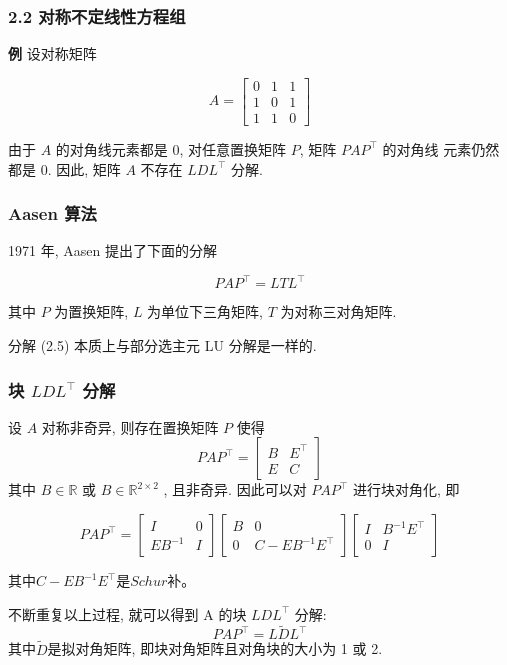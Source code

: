 \documentclass[notheorems,serif]{beamer}
\begin{document}
\begin{frame}
\frametitle{2.2 \quad 对称不定线性方程组}
{\bfseries 例} 设对称矩阵

\begin{equation}
A=\left[\begin{array}{lll}{0} & {1} & {1} \\ {1} & {0} & {1} \\ {1} & {1} & {0}\end{array}\right]
\end{equation}

由于 $A$ 的对角线元素都是 $0$, 对任意置换矩阵 $P$, 矩阵 $P AP^{\top}$ 的对角线
元素仍然都是 $0$. 因此, 矩阵 $A$ 不存在 $LDL^{\top}$ 分解.
\end{frame}

\begin{frame}
\frametitle{Aasen 算法}
1971 年, Aasen 提出了下面的分解

\begin{equation}
P A P^{\top}=L T L^{\top}
\end{equation}

其中 $P$ 为置换矩阵, $L$ 为单位下三角矩阵, $T$ 为对称三对角矩阵.

分解 (2.5) 本质上与部分选主元 LU 分解是一样的.
\end{frame}

\begin{frame}
\frametitle{块 $LDL^{\top}$ 分解}
设 $A$ 对称非奇异, 则存在置换矩阵 $P$ 使得
\begin{equation}
P A P^{\top}=\left[\begin{array}{cc}{B} & {E^{\top}} \\ {E} & {C}\end{array}\right]
\end{equation}
其中 $B ∈ \mathbb{R}$ 或 $B ∈ \mathbb{R}^{2×2}$
, 且非奇异. 因此可以对 $P AP^{\top}$ 进行块对角化, 即

\begin{equation}
P A P^{\top}=\left[\begin{array}{cc}{I} & {0} \\ {E B^{-1}} & {I}\end{array}\right]\left[\begin{array}{cc}{B} & {0} \\ {0} & {C-E B^{-1} E^{\top}}\end{array}\right]\left[\begin{array}{cc}{I} & {B^{-1} E^{\top}} \\ {0} & {I}\end{array}\right]
\end{equation}

其中$C-E B^{-1} E^{\top}$是$Schur$补。

不断重复以上过程, 就可以得到 A 的块 $LDL^{\top}$ 分解:
\begin{equation}
P A P^{\top}=L \tilde{D} L^{\top}
\end{equation}
其中$\tilde{D}$是拟对角矩阵, 即块对角矩阵且对角块的大小为 1 或 2.
\end{frame}
\end{document}

